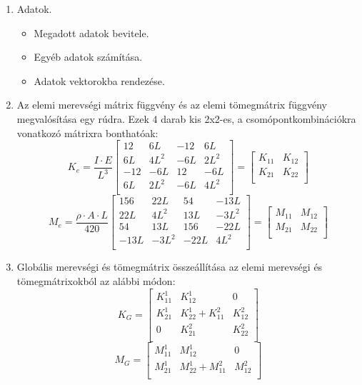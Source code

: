 \documentclass[12pt,a4paper] {article}
\begin{document}
\begin{enumerate}
	\item Adatok.
	\begin{itemize}
		\item Megadott adatok bevitele.
		\item Egyéb adatok számítása.
		\item Adatok vektorokba rendezése.
	\end{itemize}
	\item Az elemi merevségi mátrix függvény és az elemi tömegmátrix függvény megvalósítása egy rúdra. Ezek 4 darab kis 2x2-es, a csomópontkombinációkra vonatkozó mátrixra bonthatóak:
	\[
	K_e= \frac{I \cdot E}{L^3}  
	\begin{bmatrix}
	12&6L&-12&6L\\
	6L&4L^2&-6L&2L^2\\
	-12&-6L&12&-6L\\
	6L&2L^2&-6L&4L^2\\
	\end{bmatrix}
	=\begin{bmatrix}
	K_{11} &K_{12} \\
	K_{21} &K_{22} \\
	\end{bmatrix}
	\]
	\[
	M_e= \frac{\rho \cdot A \cdot L}{420}  
	\begin{bmatrix}
	156&22L&54&-13L\\
	22L&4L^2&13L&-3L^2\\
	54&13L&156&-22L\\
	-13L&-3L^2&-22L&4L^2\\
	\end{bmatrix}
	=\begin{bmatrix}
	M_{11} &M_{12} \\
	M_{21} &M_{22} \\
	\end{bmatrix}
	\]
	\item Globális merevségi és tömegmátrix összeállítása az elemi merevségi és tömegmátrixokból az alábbi módon:
	\[K_G=
	\begin{bmatrix}
	K_{11}^1 &K_{12}^1 &0  \\
	K_{21}^1 &K_{22}^1+K_{11}^2 &K_{12}^2  \\
	0 &K_{21}^2 &K_{22}^2 \\
	\end{bmatrix}
	\]
	\[M_G=
	\begin{bmatrix}
	M_{11}^1 &M_{12}^1 &0  \\
	M_{21}^1 &M_{22}^1+M_{11}^2 &M_{12}^2  \\

\end{bmatrix}\]
\end{enumerate}
\end{document}
